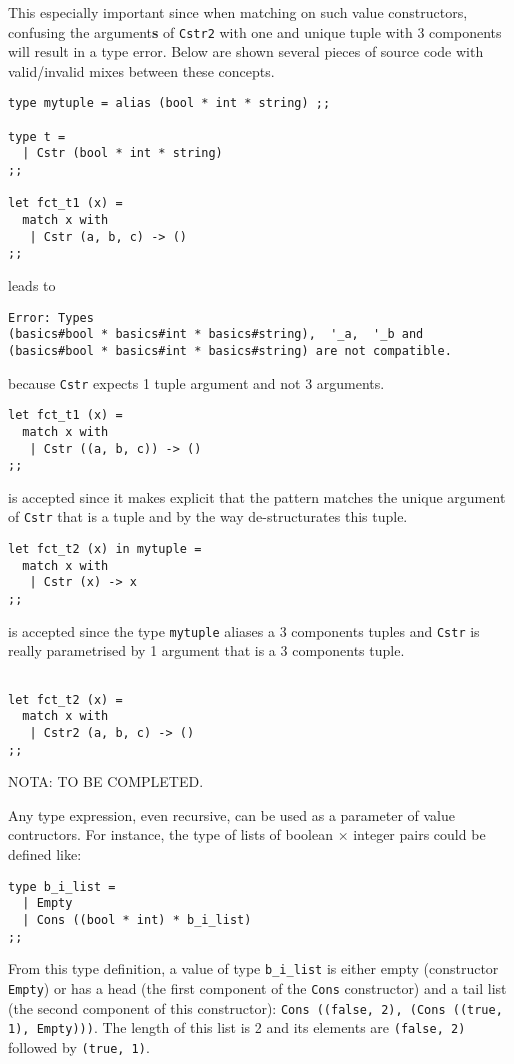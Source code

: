 \medskip
This especially important since when matching on such value
constructors, confusing the argument{\bf s} of {\tt Cstr2} with
one and unique tuple with 3 components will result in a type error.
Below are shown several pieces of source code with valid/invalid mixes
between these concepts.
{\scriptsize
\begin{lstlisting}
type mytuple = alias (bool * int * string) ;;

type t =
  | Cstr (bool * int * string)
;;

let fct_t1 (x) =
  match x with
   | Cstr (a, b, c) -> ()
;;
\end{lstlisting}
}
\noindent leads to
\begin{verbatim}
Error: Types
(basics#bool * basics#int * basics#string),  '_a,  '_b and
(basics#bool * basics#int * basics#string) are not compatible.
\end{verbatim}
\noindent because {\tt Cstr} expects 1 tuple argument and not 3
arguments.

\medskip
{\scriptsize
\begin{lstlisting}
let fct_t1 (x) =
  match x with
   | Cstr ((a, b, c)) -> ()
;;
\end{lstlisting}
}
\noindent is accepted since it makes explicit that the pattern matches
the unique argument of {\tt Cstr} that is a tuple and by the way
de-structurates this tuple.

\medskip
{\scriptsize
\begin{lstlisting}
let fct_t2 (x) in mytuple =
  match x with
   | Cstr (x) -> x
;;
\end{lstlisting}
}
\noindent is accepted since the type {\tt mytuple} aliases a 3
components tuples and {\tt Cstr} is really parametrised by 1 argument
that is a 3 components tuple.

{\scriptsize
\begin{lstlisting}

let fct_t2 (x) =
  match x with
   | Cstr2 (a, b, c) -> ()
;;
\end{lstlisting}
}

NOTA: TO BE COMPLETED.

Any type expression, even recursive, can be used as a  parameter of
value contructors.
For instance, the type of lists of boolean $\times$ integer pairs
could be defined like:
{\scriptsize
\begin{lstlisting}
type b_i_list =
  | Empty
  | Cons ((bool * int) * b_i_list)
;;
\end{lstlisting}
} From this type definition, a value of type {\tt b\_i\_list} is
either empty (constructor {\tt Empty}) or has a head (the first
component of the {\tt Cons} constructor) and a tail list (the
second component of this constructor): {\tt Cons ((false, 2), (Cons
  ((true, 1), Empty)))}. The length of this list is 2 and its
elements are {\tt (false, 2)} followed by {\tt (true, 1)}.

